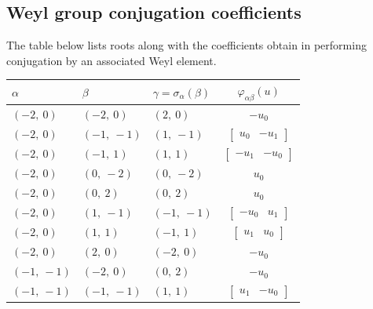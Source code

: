 \documentclass[11pt]{article}
\newcommand{\noi}{\noindent}
\theoremstyle{definition}
\begin{document}
\subsection{Weyl group conjugation coefficients}

The table below lists roots along with the coefficients obtain in performing conjugation by an associated Weyl element.

\bigskip

\noi \noindent \begin{longtable}{|l|l|l|c|}
    \hline
    \textbf{$\alpha$} & \textbf{$\beta$} & \textbf{$\gamma = \sigma_{\alpha}(\beta)$} & $\varphi_{\alpha\beta}(u)$ \\
    \hline
    \endhead
    $\left( -2, \  0\right)$ & $\left( -2, \  0\right)$ & $\left( 2, \  0\right)$ & $- u_{0}$ \\
    \hline
    $\left( -2, \  0\right)$ & $\left( -1, \  -1\right)$ & $\left( 1, \  -1\right)$ & $\left[\begin{matrix}u_{0} & - u_{1}\end{matrix}\right]$ \\
    \hline
    $\left( -2, \  0\right)$ & $\left( -1, \  1\right)$ & $\left( 1, \  1\right)$ & $\left[\begin{matrix}- u_{1} & - u_{0}\end{matrix}\right]$ \\
    \hline
    $\left( -2, \  0\right)$ & $\left( 0, \  -2\right)$ & $\left( 0, \  -2\right)$ & $u_{0}$ \\
    \hline
    $\left( -2, \  0\right)$ & $\left( 0, \  2\right)$ & $\left( 0, \  2\right)$ & $u_{0}$ \\
    \hline
    $\left( -2, \  0\right)$ & $\left( 1, \  -1\right)$ & $\left( -1, \  -1\right)$ & $\left[\begin{matrix}- u_{0} & u_{1}\end{matrix}\right]$ \\
    \hline
    $\left( -2, \  0\right)$ & $\left( 1, \  1\right)$ & $\left( -1, \  1\right)$ & $\left[\begin{matrix}u_{1} & u_{0}\end{matrix}\right]$ \\
    \hline
    $\left( -2, \  0\right)$ & $\left( 2, \  0\right)$ & $\left( -2, \  0\right)$ & $- u_{0}$ \\
    \hline
    $\left( -1, \  -1\right)$ & $\left( -2, \  0\right)$ & $\left( 0, \  2\right)$ & $- u_{0}$ \\
    \hline
    $\left( -1, \  -1\right)$ & $\left( -1, \  -1\right)$ & $\left( 1, \  1\right)$ & $\left[\begin{matrix}u_{1} & - u_{0}\end{matrix}\right]$ \\

\end{longtable}
\end{document}
